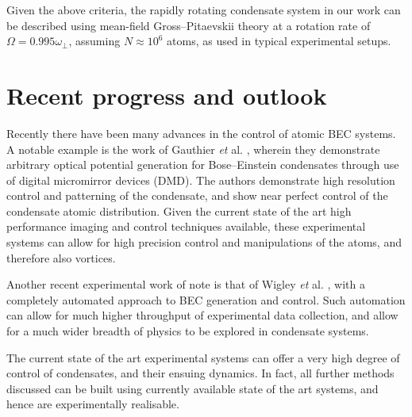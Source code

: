 Given the above criteria, the rapidly rotating condensate system in our work can be described using mean-field Gross--Pitaevskii theory at a rotation rate of $\Omega = 0.995\omega_{\perp}$, assuming $N\approx 10^6$ atoms, as used in typical experimental setups.

\section{Recent progress and outlook}
Recently there have been many advances in the control of atomic BEC systems. A notable example is the work of Gauthier \textit{et} al. \cite{BEC:Gauthier_arxiv_2016}, wherein they demonstrate arbitrary optical potential generation for Bose--Einstein condensates through use of digital micromirror devices (DMD). The authors demonstrate high resolution control and patterning of the condensate, and show near perfect control of the condensate atomic distribution. Given the current state of the art high performance imaging and control techniques available, these experimental systems can allow for high precision control and manipulations of the atoms, and therefore also vortices.

Another recent experimental work of note is that of Wigley \textit{et} al. \cite{BEC:Wigley_scirep_2016}, with a completely automated approach to BEC generation and control. Such automation can allow for much higher throughput of experimental data collection, and allow for a much wider breadth of physics to be explored in condensate systems.

The current state of the art experimental systems can offer a very high degree of control of condensates, and their ensuing dynamics. In fact, all further methods discussed can be built using currently available state of the art systems, and hence are experimentally realisable.
